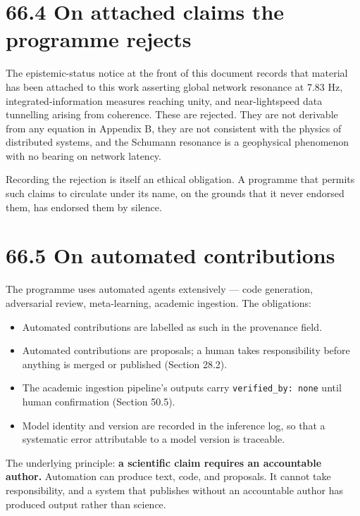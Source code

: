 \documentclass[
  11pt]{report}
\providecommand{\tightlist}{%
  \setlength{\itemsep}{0pt}\setlength{\parskip}{0pt}}
\begin{document}
\hypertarget{on-attached-claims-the-programme-rejects}{%
\section{66.4 On attached claims the programme
rejects}\label{on-attached-claims-the-programme-rejects}}

The epistemic-status notice at the front of this document records that
material has been attached to this work asserting global network
resonance at 7.83 Hz, integrated-information measures reaching unity,
and near-lightspeed data tunnelling arising from coherence. These are
rejected. They are not derivable from any equation in Appendix B, they
are not consistent with the physics of distributed systems, and the
Schumann resonance is a geophysical phenomenon with no bearing on
network latency.

Recording the rejection is itself an ethical obligation. A programme
that permits such claims to circulate under its name, on the grounds
that it never endorsed them, has endorsed them by silence.

\hypertarget{on-automated-contributions}{%
\section{66.5 On automated
contributions}\label{on-automated-contributions}}

The programme uses automated agents extensively --- code generation,
adversarial review, meta-learning, academic ingestion. The obligations:

\begin{itemize}
\tightlist
\item
  Automated contributions are labelled as such in the provenance field.
\item
  Automated contributions are proposals; a human takes responsibility
  before anything is merged or published (Section 28.2).
\item
  The academic ingestion pipeline's outputs carry
  \texttt{verified\_by:\ none} until human confirmation (Section 50.5).
\item
  Model identity and version are recorded in the inference log, so that
  a systematic error attributable to a model version is traceable.
\end{itemize}

The underlying principle: \textbf{a scientific claim requires an
accountable author.} Automation can produce text, code, and proposals.
It cannot take responsibility, and a system that publishes without an
accountable author has produced output rather than science.
\end{document}
